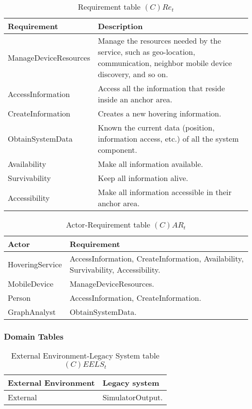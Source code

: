 \begin{table}[H]
	\centering
	\begin{tabular}{|p{4cm}|p{8cm}|}
			\hline
			\textbf{Requirement} & \textbf{Description} \\
			\hline
			ManageDeviceResources & Manage the resources needed by the service, such
			as geo-location, communication, neighbor mobile device discovery, and so on. \\
			\hline
			AccessInformation & Access all the information that reside inside an anchor area. \\
			\hline
			CreateInformation & Creates a new hovering information. \\
			\hline
			ObtainSystemData & Known the current data (position, information access,
			etc.) of all the system component. \\
			\hline
			Availability & Make all information available. \\
			\hline
			Survivability & Keep all information alive. \\
			\hline
			Accessibility & Make all information accessible in their anchor area. \\
			\hline
		\end{tabular}
	\caption{Requirement table $(C)Re_t$}
	\label{tab:cact}
\end{table}

\begin{table}[H]
	\centering
	\begin{tabular}{|p{4cm}|p{8cm}|}
			\hline
			\textbf{Actor} & \textbf{Requirement} \\
			\hline
			HoveringService & AccessInformation, CreateInformation, Availability,
			Survivability, Accessibility. \\
			\hline
			MobileDevice & ManageDeviceResources. \\
			\hline
			Person & AccessInformation, CreateInformation. \\
			\hline
			GraphAnalyst & ObtainSystemData. \\
			\hline
		\end{tabular}
	\caption{Actor-Requirement table $(C)AR_t$}
	\label{tab:cart}
\end{table}

\subsubsection*{Domain Tables}

\begin{table}[H]
	\centering
	\begin{tabular}{|p{4cm}|p{8cm}|}
			\hline
			\textbf{External Environment} & \textbf{Legacy system} \\
			\hline
			External & SimulatorOutput. \\
			\hline
		\end{tabular}
	\caption{External Environment-Legacy System table $(C)EELS_t$}
	\label{tab:ceelst}
\end{table}

